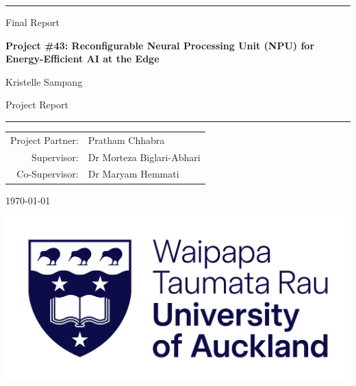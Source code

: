 \documentclass[12pt, a4paper, ukenglish]{article}
\newcommand\HRule{\noindent\rule{\linewidth}{2pt}}
\begin{document}
\def\name{Kristelle Sampang}
\def\reportNumber{COMPSYS043-\the\year}

\thispagestyle{empty}

\begin{center}
    \vspace*{10mm}

    \vspace*{10mm}
    \HRule
    
    \vspace{0.5cm}
    Final Report
    \vspace{0.5cm}
    
    {\Large \textbf{Project \#43: Reconfigurable Neural Processing Unit (NPU) for Energy-Efficient AI at the Edge}}
    
    \vspace{1cm}
    {\large \name}
    
    \vspace{0.5cm}
    Project Report 
    
    \vspace{0.5cm}
    \HRule
\end{center}

\vfill
\begin{center}
    \begin{tabular}{r l}
        \addlinespace[1.5em]
        Project Partner: & Pratham Chhabra \\
        \addlinespace[1.5em]
        Supervisor: & Dr Morteza Biglari-Abhari \\
        \addlinespace[1.5em]
        Co-Supervisor: & Dr Maryam Hemmati
    \end{tabular}
\end{center}

\vfill
\begin{center}
    \today
\end{center}

\vfill
\begin{center}
    \includegraphics[width=0.4\linewidth]{figures/UoA-Logo-Primary-RGB-Large.png}
\end{center}
\end{document}
